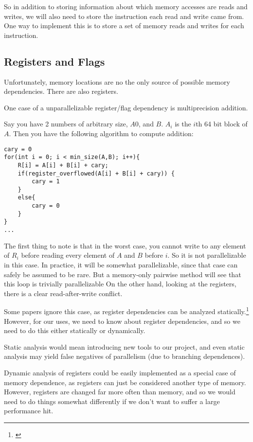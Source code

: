 \documentclass[12pt,twoside]{reedthesis}
\begin{document}
		So in addition to storing information about which memory accesses are reads and writes, we will also need to store the instruction each read and write came from. One way to implement this is to store a set of memory reads and writes for each instruction.

		\subsection{Registers and Flags}
		Unfortunately, memory locations are no the only source of possible memory dependencies. There are also registers.


		One case of a unparallelizable register/flag dependency is multiprecision addition.

		Say you have 2 numbers of arbitrary size, $A0$, and $B$. $A_i$ is the $i$th 64 bit block of $A$. Then you have the following algorithm to compute addition:

		\begin{lstlisting}
cary = 0
for(int i = 0; i < min_size(A,B); i++){
	R[i] = A[i] + B[i] + cary;
	if(register_overflowed(A[i] + B[i] + cary)) {
		cary = 1
	}
	else{
		cary = 0
	}
}
...
		\end{lstlisting}

		The first thing to note is that in the worst case, you cannot write to any element of $R_i$ before reading every element of $A$ and $B$ before $i$. So it is not parallelizable in this case. In practice, it will be somewhat parallelizable, since that case can safely be assumed to be rare. But a memory-only pairwise method will see that this loop is trivially parallelizable On the other hand, looking at the registers, there is a clear read-after-write conflict.

		Some papers ignore this case, as register dependencies can be analyzed statically.\footnote{\cite{Chen:2004}} However, for our uses, we need to know about register dependencies, and so we need to do this either statically or dynamically.

		Static analysis would mean introducing new tools to our project, and even static analysis may yield false negatives of parallelism (due to branching dependences).

		Dynamic analysis of registers could be easily implemented as a special case of memory dependence, as registers can just be considered another type of memory. However, registers are changed far more often than memory, and so we would need to do things somewhat differently if we don't want to suffer a large performance hit.
\end{document}

